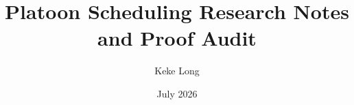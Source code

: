 \documentclass[12pt]{article}
\begin{document}
\title{Platoon Scheduling Research Notes and Proof Audit}
\author{Keke Long}
\date{July 2026}
\maketitle
\tableofcontents



\clearpage

\clearpage

\clearpage

\end{document}
